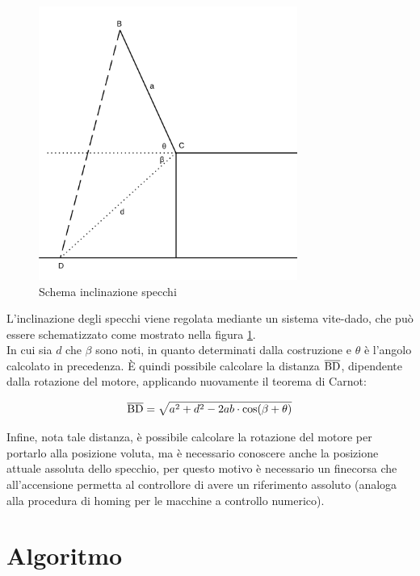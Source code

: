 \documentclass[12pt]{article}
\begin{document}
    \begin{figure}[h]
    \centering
        \includegraphics[width=240pt]{Draws/Linear_inclination_trig.png}
        \caption{Schema inclinazione specchi}
        \label{mirror_inclination_system}
    \end{figure}
    
    
    L'inclinazione degli specchi viene regolata mediante un sistema vite-dado, che può essere schematizzato come mostrato nella figura \ref{mirror_inclination_system}.\\
    
    In cui sia $d$ che $\beta$ sono noti, in quanto determinati dalla costruzione e $\theta$ è l'angolo calcolato in precedenza. È quindi possibile calcolare la distanza $\overline{\rm BD}$, dipendente dalla rotazione del motore, applicando nuovamente il teorema di Carnot:
    
    \begin{equation}
        \overline{\rm BD} = \sqrt{a^2 + d^2 - 2 a b \cdot \cos(\beta + \theta)}
    \end{equation}
    
    \vspace{1.5cm}
    
    Infine, nota tale distanza, è possibile calcolare la rotazione del motore per portarlo alla posizione voluta, ma è necessario conoscere anche la posizione attuale assoluta dello specchio, per questo motivo è necessario un finecorsa che all'accensione permetta al controllore di avere un riferimento assoluto (analoga alla procedura di homing per le macchine a controllo numerico).

\newpage
\section{Algoritmo}
\end{document}
